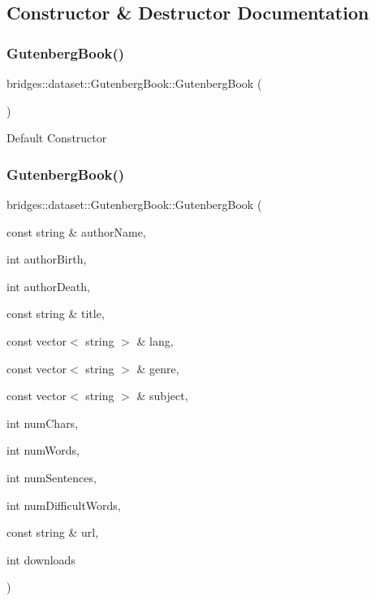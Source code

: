 \subsection{Constructor \& Destructor Documentation}
\mbox{\label{classbridges_1_1dataset_1_1_gutenberg_book_ab88639acb3d28345f1db063d603f1123}} 
\subsubsection{\texorpdfstring{Gutenberg\+Book()}{GutenbergBook()}\hspace{0.1cm}{\footnotesize\ttfamily [1/2]}}
{\footnotesize\ttfamily bridges\+::dataset\+::\+Gutenberg\+Book\+::\+Gutenberg\+Book (\begin{DoxyParamCaption}{ }\end{DoxyParamCaption})\hspace{0.3cm}{\ttfamily [inline]}}

Default Constructor \mbox{\label{classbridges_1_1dataset_1_1_gutenberg_book_abe1720623c08625c3e8760830d6c1aa0}} 
\subsubsection{\texorpdfstring{Gutenberg\+Book()}{GutenbergBook()}\hspace{0.1cm}{\footnotesize\ttfamily [2/2]}}
{\footnotesize\ttfamily bridges\+::dataset\+::\+Gutenberg\+Book\+::\+Gutenberg\+Book (\begin{DoxyParamCaption}\item[{const string \&}]{author\+Name,  }\item[{int}]{author\+Birth,  }\item[{int}]{author\+Death,  }\item[{const string \&}]{title,  }\item[{const vector$<$ string $>$ \&}]{lang,  }\item[{const vector$<$ string $>$ \&}]{genre,  }\item[{const vector$<$ string $>$ \&}]{subject,  }\item[{int}]{num\+Chars,  }\item[{int}]{num\+Words,  }\item[{int}]{num\+Sentences,  }\item[{int}]{num\+Difficult\+Words,  }\item[{const string \&}]{url,  }\item[{int}]{downloads }\end{DoxyParamCaption})\hspace{0.3cm}{\ttfamily [inline]}}

